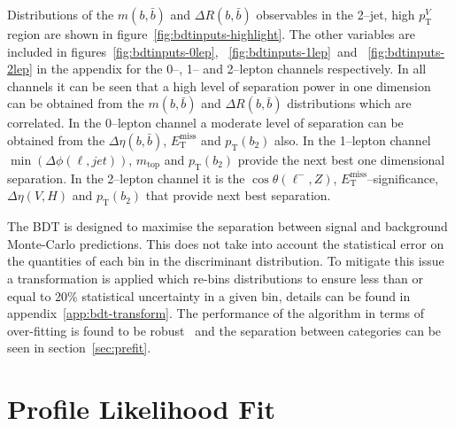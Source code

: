Distributions of the $m(b,\bar{b})$ and $\Delta R (b, \bar{b})$ observables in
the 2--jet, high $p_{\mathrm{T}}^V$ region are shown in
figure~\ref{fig:bdtinputs-highlight}. The other variables are included in
figures~\ref{fig:bdtinputs-0lep}, ~\ref{fig:bdtinputs-1lep}~and
~\ref{fig:bdtinputs-2lep} in the appendix for the 0--, 1-- and 2--lepton
channels respectively. In all channels it can be seen that a high level of
separation power in one dimension can be obtained from the $m(b,\bar{b})$ and
$\Delta R (b, \bar{b})$ distributions which are correlated. In the 0--lepton
channel a moderate level of separation can be obtained from the $\Delta \eta(b,
\bar{b})$, $E_{\mathrm{T}}^{\text{miss}}$ and $p_{\mathrm{T}}(b_2)$ also. In the
1--lepton channel $\min(\Delta\phi(\ell,jet))$, $m_{\text{top}}$ and
$p_{\mathrm{T}}(b_2)$ provide the next best one dimensional separation. In the
2--lepton channel it is the $\cos{\theta(\ell^-,Z)}$,
$E_{\mathrm{T}}^{\text{miss}}$--significance, $\Delta \eta(V, H)$ and
$p_{\mathrm{T}}(b_2)$ that provide next best separation.



The BDT is designed to maximise the separation between signal and background
Monte-Carlo predictions. This does not take into account the statistical error
on the quantities of each bin in the discriminant distribution. To mitigate this
issue a transformation is applied which re-bins distributions to ensure less than
or equal to 20\% statistical uncertainty in a given bin, details can be found in
appendix~\ref{app:bdt-transform}. The performance of the algorithm in terms of
over-fitting is found to be robust~\cite{VHMainNote2019} and the separation
between categories can be seen in section~\ref{sec:prefit}.

\section{Profile Likelihood Fit}%
\label{sec:plf}

